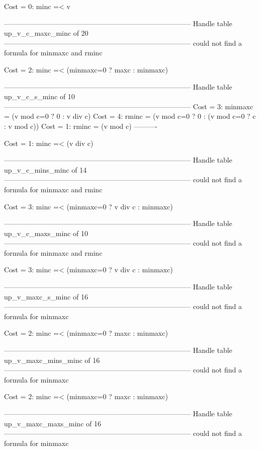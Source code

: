 Cost =  0:  minc =< v

--------------------------------------------------------------------------------
Handle table up_v_c_maxc_minc of 20
--------------------------------------------------------------------------------
could not find a formula for minmaxc and rminc

Cost =  2:  minc =< (minmaxc=0 ? maxc : minmaxc)

--------------------------------------------------------------------------------
Handle table up_v_c_s_minc of 10
--------------------------------------------------------------------------------
Cost =  3:  minmaxc = (v mod c=0 ? 0 : v div c)
Cost =  4:  rminc   = (v mod c=0 ? 0 : (v mod c=0 ? c : v mod c))
Cost =  1:  rminc   = (v mod c)
----------

Cost =  1:  minc =< (v div c)

--------------------------------------------------------------------------------
Handle table up_v_c_mins_minc of 14
--------------------------------------------------------------------------------
could not find a formula for minmaxc and rminc

Cost =  3:  minc =< (minmaxc=0 ? v div c : minmaxc)

--------------------------------------------------------------------------------
Handle table up_v_c_maxs_minc of 10
--------------------------------------------------------------------------------
could not find a formula for minmaxc and rminc

Cost =  3:  minc =< (minmaxc=0 ? v div c : minmaxc)

--------------------------------------------------------------------------------
Handle table up_v_maxc_s_minc of 16
--------------------------------------------------------------------------------
could not find a formula for minmaxc

Cost =  2:  minc =< (minmaxc=0 ? maxc : minmaxc)

--------------------------------------------------------------------------------
Handle table up_v_maxc_mins_minc of 16
--------------------------------------------------------------------------------
could not find a formula for minmaxc

Cost =  2:  minc =< (minmaxc=0 ? maxc : minmaxc)

--------------------------------------------------------------------------------
Handle table up_v_maxc_maxs_minc of 16
--------------------------------------------------------------------------------
could not find a formula for minmaxc

